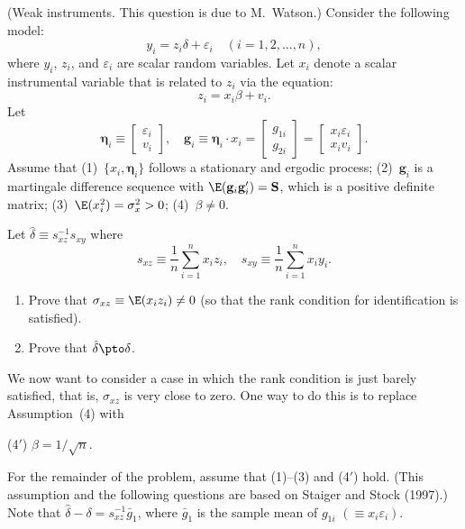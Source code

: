 \begin{problemset}
\exercise[10]
(Weak instruments.  This question is due to M.\ Watson.)  Consider the following
model:
\[
  y_i = z_i \delta + \varepsilon_i \quad (i = 1, 2, \ldots, n),
\]
where $y_i$, $z_i$, and $\varepsilon_i$ are scalar random variables.  Let $x_i$ denote a scalar
instrumental variable that is related to $z_i$ via the equation:
\[
  z_i = x_i \beta + v_i.
\]
Let
\[
  \boldsymbol{\eta}_i \equiv \begin{bmatrix} \varepsilon_i \\ v_i \end{bmatrix}, \quad
  \mathbf{g}_i \equiv \boldsymbol{\eta}_i \cdot x_i
  = \begin{bmatrix} g_{1i} \\ g_{2i} \end{bmatrix}
  = \begin{bmatrix} x_i \varepsilon_i \\ x_i v_i \end{bmatrix}.
\]
Assume that (1)~$\{x_i, \boldsymbol{\eta}_i\}$ follows a stationary and ergodic process;
(2)~$\mathbf{g}_i$ is a martingale difference sequence with
$\E(\mathbf{g}_i \mathbf{g}_i') = \mathbf{S}$, which is a positive definite matrix;
(3)~$\E(x_i^2) = \sigma_x^2 > 0$;
(4)~$\beta \neq 0$.

Let $\hat{\delta} \equiv s_{xz}^{-1} s_{xy}$ where
\[
  s_{xz} \equiv \frac{1}{n} \sum_{i=1}^{n} x_i z_i, \quad
  s_{xy} \equiv \frac{1}{n} \sum_{i=1}^{n} x_i y_i.
\]

\begin{enumerate}[label=(\alph*)]
\item Prove that $\sigma_{xz} \equiv \E(x_i z_i) \neq 0$ (so that the rank condition for
  identification is satisfied).

\item Prove that $\hat{\delta} \pto \delta$.
\end{enumerate}

We now want to consider a case in which the rank condition is just barely
satisfied, that is, $\sigma_{xz}$ is very close to zero.  One way to do this is to replace
Assumption~(4) with

\noindent (4$'$) $\beta = 1/\sqrt{n}$.

For the remainder of the problem, assume that (1)--(3) and (4$'$) hold.  (This
assumption and the following questions are based on Staiger and Stock (1997).)
Note that $\hat{\delta} - \delta = s_{xz}^{-1} \bar{g}_1$, where $\bar{g}_1$ is the sample mean
of $g_{1i}$ $(\equiv x_i \varepsilon_i)$.


\end{problemset}
